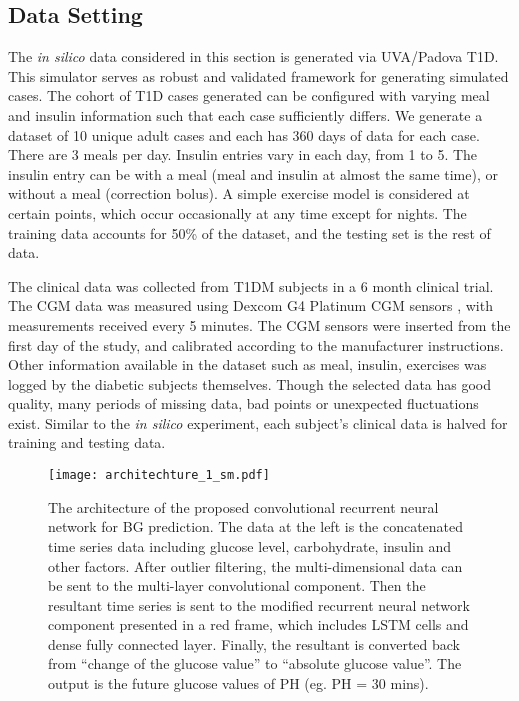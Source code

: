 \documentclass[a4paper, 10 pt, twocolumn]{IEEEtran}
\begin{document}
\subsection{ {Data Setting}}{
The \emph{in silico} data considered in this section is generated via UVA/Padova T1D. This simulator serves as robust and validated framework for generating simulated cases. The cohort of T1D cases generated can be
configured with varying meal and insulin information such that each case sufficiently differs.
We generate a dataset of 10 unique adult cases and each has 360 days of data for each case. There are 3 meals per day. Insulin entries vary in each day, from 1 to 5. The insulin entry can be with a meal (meal and insulin
at almost the same time), or without a meal (correction bolus).
A simple exercise model is considered at certain points, which occur occasionally at any time except for nights. The training data accounts for 50\% of the dataset, and the testing set is the rest of data.

The clinical data was collected from T1DM subjects in a 6 month clinical trial.
The CGM data was measured using Dexcom G4 Platinum CGM sensors , with measurements received every 5 minutes. The CGM sensors were inserted from the first day of the study, and calibrated according to the manufacturer
instructions. Other information available in the dataset such as meal, insulin, exercises was logged by the diabetic subjects themselves.
Though the selected data has good quality, many periods of missing data, bad points or unexpected fluctuations exist. Similar to the \emph{in silico} experiment, each subject's clinical data is halved for training and
testing data.
}

 \begin{figure*}[t]
  \texttt{[image: architechture\_1\_sm.pdf]} %
  \centering
  \caption{The architecture of the proposed convolutional recurrent neural network for  {BG} prediction. The data at the left is the concatenated time series data including glucose level, carbohydrate, insulin and other
  factors. After outlier filtering, the multi-dimensional data can be sent to the multi-layer convolutional component. Then the resultant time series is sent to the modified recurrent neural network component presented in
  a red frame, which includes LSTM cells and dense fully connected layer. Finally, the resultant is converted back from ``change of the glucose value'' to    ``absolute glucose value''. The output is the future glucose
  values of PH (eg. PH = 30 mins).}\label{fig:cnn_lstm1}
  \centering
 \end{figure*}
\end{document}
